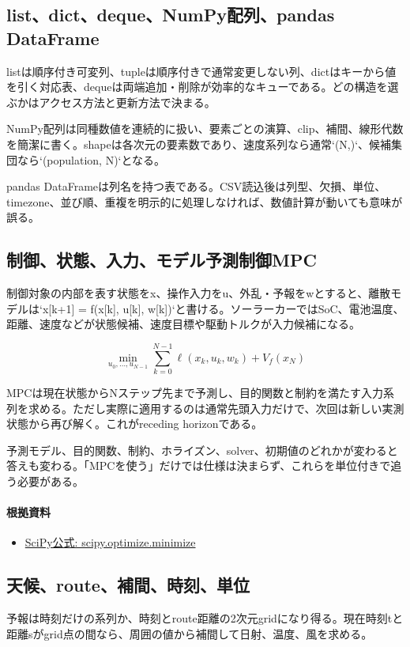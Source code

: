 \documentclass[a4paper,11pt]{article}
\begin{document}
\subsection{list、dict、deque、NumPy配列、pandas DataFrame}
listは順序付き可変列、tupleは順序付きで通常変更しない列、dictはキーから値を引く対応表、dequeは両端追加・削除が効率的なキューである。どの構造を選ぶかはアクセス方法と更新方法で決まる。


NumPy配列は同種数値を連続的に扱い、要素ごとの演算、clip、補間、線形代数を簡潔に書く。shapeは各次元の要素数であり、速度系列なら通常`(N,)`、候補集団なら`(population, N)`となる。


pandas DataFrameは列名を持つ表である。CSV読込後は列型、欠損、単位、timezone、並び順、重複を明示的に処理しなければ、数値計算が動いても意味が誤る。



\subsection{制御、状態、入力、モデル予測制御MPC}
制御対象の内部を表す状態をx、操作入力をu、外乱・予報をwとすると、離散モデルは`x[k+1] = f(x[k], u[k], w[k])`と書ける。ソーラーカーではSoC、電池温度、距離、速度などが状態候補、速度目標や駆動トルクが入力候補になる。


\[
\min_{u_0,\ldots,u_{N-1}} \sum_{k=0}^{N-1}\ell(x_k,u_k,w_k)+V_f(x_N)
\]

MPCは現在状態からNステップ先まで予測し、目的関数と制約を満たす入力系列を求める。ただし実際に適用するのは通常先頭入力だけで、次回は新しい実測状態から再び解く。これがreceding horizonである。


予測モデル、目的関数、制約、ホライズン、solver、初期値のどれかが変わると答えも変わる。「MPCを使う」だけでは仕様は決まらず、これらを単位付きで追う必要がある。

\paragraph{根拠資料}
\begin{itemize}[leftmargin=1.6em]
\item \href{https://docs.scipy.org/doc/scipy/reference/generated/scipy.optimize.minimize.html}{SciPy公式: scipy.optimize.minimize}
\end{itemize}

\subsection{天候、route、補間、時刻、単位}
予報は時刻だけの系列か、時刻とroute距離の2次元gridになり得る。現在時刻tと距離sがgrid点の間なら、周囲の値から補間して日射、温度、風を求める。
\end{document}
